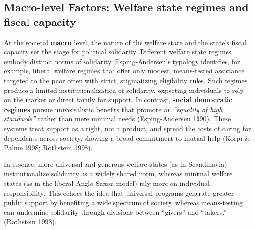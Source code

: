 \documentclass[12pt]{article}
\begin{document}
\subsection{Macro-level Factors: Welfare state regimes and fiscal
capacity}\label{macro-level-factors-welfare-state-regimes-and-fiscal-capacity}

At the societal \textbf{macro} level, the nature of the welfare state
and the state's fiscal capacity set the stage for political solidarity.
Different welfare state regimes embody distinct norms of solidarity.
Esping-Andersen's typology identifies, for example, liberal welfare
regimes that offer only modest, means-tested assistance targeted to the
poor often with strict, stigmatizing eligibility rules. Such regimes
produce a limited institutionalization of solidarity, expecting
individuals to rely on the market or direct family for support. In
contrast, \textbf{social democratic regimes} pursue universalistic
benefits that promote an \emph{``equality of high standards''} rather
than mere minimal needs (Esping-Andersen 1990). These systems treat
support as a right, not a product, and spread the costs of caring for
dependents across society, showing a broad commitment to mutual help
(Korpi \& Palme 1998; Rothstein 1998).

In essence, more universal and generous welfare states (as in
Scandinavia) institutionalize solidarity as a widely shared norm,
whereas minimal welfare states (as in the liberal Anglo-Saxon model)
rely more on individual responsibility. This echoes the idea that
universal programs generate greater public support by benefiting a wide
spectrum of society, whereas means-testing can undermine solidarity
through divisions between ``givers'' and ``takers.'' (Rothstein 1998).
\end{document}
